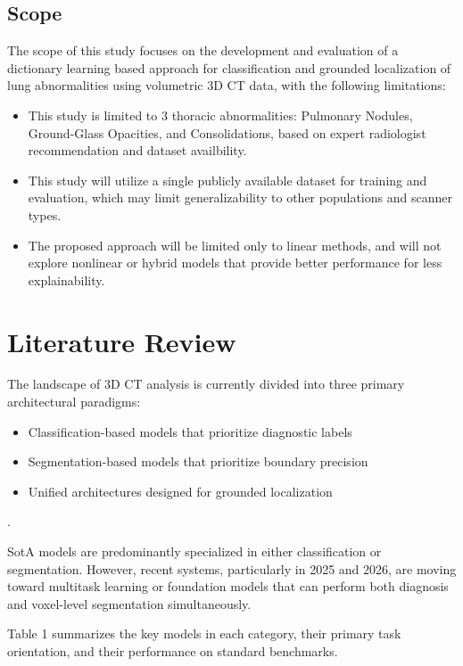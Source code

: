 \subsection{Scope}
The scope of this study focuses on the development and evaluation of a dictionary learning based approach for classification
and grounded localization of lung abnormalities using volumetric 3D CT data, with the following limitations:

\begin{itemize}
	\item This study is limited to 3 thoracic abnormalities: Pulmonary Nodules, Ground-Glass Opacities, and Consolidations, based on expert radiologist recommendation and dataset availbility.
	\item This study will utilize a single publicly available dataset for training and evaluation, which may limit generalizability to other populations and scanner types.
	\item The proposed approach will be limited only to linear methods, and will not explore nonlinear or hybrid models that provide better performance for less explainability.
\end{itemize}

\section{Literature Review}
The landscape of 3D CT analysis is currently divided into three primary architectural paradigms:
\begin{itemize}
	\item Classification-based models that prioritize diagnostic labels
	\item Segmentation-based models that prioritize boundary precision
	\item Unified architectures designed for grounded localization
\end{itemize}.

SotA models are predominantly specialized in either classification or segmentation. However, recent systems, particularly
in 2025 and 2026, are moving toward multitask learning or foundation models that can perform both diagnosis and voxel-level
segmentation simultaneously.

Table 1 summarizes the key models in each category, their primary task orientation, and their performance on standard benchmarks.

